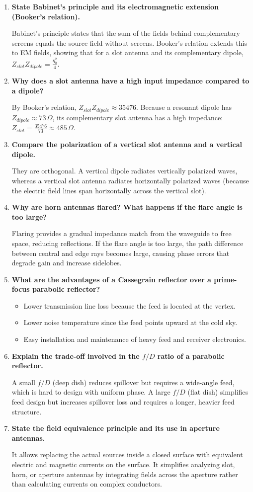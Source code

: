 \documentclass[12pt,a4paper]{article}
\newcommand{\Q}[1]{\textbf{#1}\par\noindent\ignorespaces}
\begin{document}
\begin{tcolorbox}[exambox, title={\textbf{Frequently Asked / Viva Questions}}]
\begin{enumerate}[topsep=0pt, label=\textbf{Q\arabic*.}, itemsep=5pt]
  \item \Q{State Babinet's principle and its electromagnetic extension (Booker's relation).}
    Babinet's principle states that the sum of the fields behind complementary screens equals the source field without screens. Booker's relation extends this to EM fields, showing that for a slot antenna and its complementary dipole, $Z_{slot} Z_{dipole} = \frac{\eta_0^2}{4}$.
  \item \Q{Why does a slot antenna have a high input impedance compared to a dipole?}
    By Booker's relation, $Z_{slot} Z_{dipole} \approx 35476$. Because a resonant dipole has $Z_{dipole} \approx 73\,\Omega$, its complementary slot antenna has a high impedance: $Z_{slot} = \frac{35476}{73} \approx 485\,\Omega$.
  \item \Q{Compare the polarization of a vertical slot antenna and a vertical dipole.}
    They are orthogonal. A vertical dipole radiates vertically polarized waves, whereas a vertical slot antenna radiates horizontally polarized waves (because the electric field lines span horizontally across the vertical slot).
  \item \Q{Why are horn antennas flared? What happens if the flare angle is too large?}
    Flaring provides a gradual impedance match from the waveguide to free space, reducing reflections. If the flare angle is too large, the path difference between central and edge rays becomes large, causing phase errors that degrade gain and increase sidelobes.
  \item \Q{What are the advantages of a Cassegrain reflector over a prime-focus parabolic reflector?}
    \begin{itemize}[leftmargin=*, itemsep=1pt, topsep=2pt]
      \item Lower transmission line loss because the feed is located at the vertex.
      \item Lower noise temperature since the feed points upward at the cold sky.
      \item Easy installation and maintenance of heavy feed and receiver electronics.
    \end{itemize}
  \item \Q{Explain the trade-off involved in the $f/D$ ratio of a parabolic reflector.}
    A small $f/D$ (deep dish) reduces spillover but requires a wide-angle feed, which is hard to design with uniform phase. A large $f/D$ (flat dish) simplifies feed design but increases spillover loss and requires a longer, heavier feed structure.
  \item \Q{State the field equivalence principle and its use in aperture antennas.}
    It allows replacing the actual sources inside a closed surface with equivalent electric and magnetic currents on the surface. It simplifies analyzing slot, horn, or aperture antennas by integrating fields across the aperture rather than calculating currents on complex conductors.
\end{enumerate}
\end{tcolorbox}
\end{document}
